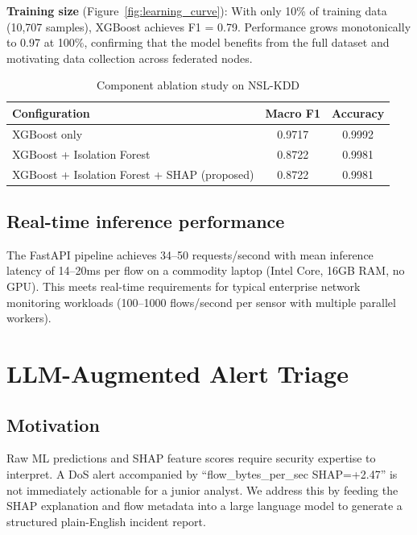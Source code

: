 \documentclass[review]{elsarticle}  %
\begin{document}
\textbf{Training size} (Figure~\ref{fig:learning_curve}):
With only 10\% of training data (10,707 samples), XGBoost
achieves F1 = 0.79. Performance grows monotonically to 0.97
at 100\%, confirming that the model benefits from the full
dataset and motivating data collection across federated nodes.

\begin{table}[h]
\centering
\caption{Component ablation study on NSL-KDD}
\label{tab:ablation}
\begin{tabular}{lcc}
\hline
\textbf{Configuration} & \textbf{Macro F1} & \textbf{Accuracy} \\
\hline
XGBoost only & 0.9717 & 0.9992 \\
XGBoost + Isolation Forest & 0.8722 & 0.9981 \\
XGBoost + Isolation Forest + SHAP (proposed) & 0.8722 & 0.9981 \\
\hline
\end{tabular}
\end{table}

\subsection{Real-time inference performance}

The FastAPI pipeline achieves 34--50 requests/second with
mean inference latency of 14--20ms per flow on a commodity
laptop (Intel Core, 16GB RAM, no GPU). This meets real-time
requirements for typical enterprise network monitoring
workloads (100--1000 flows/second per sensor with
multiple parallel workers).

\section{LLM-Augmented Alert Triage}
\label{sec:llm}

\subsection{Motivation}

Raw ML predictions and SHAP feature scores require security
expertise to interpret. A DoS alert accompanied by
``flow\_bytes\_per\_sec SHAP=+2.47'' is not immediately
actionable for a junior analyst. We address this by feeding
the SHAP explanation and flow metadata into a large language
model to generate a structured plain-English incident report.
\end{document}
